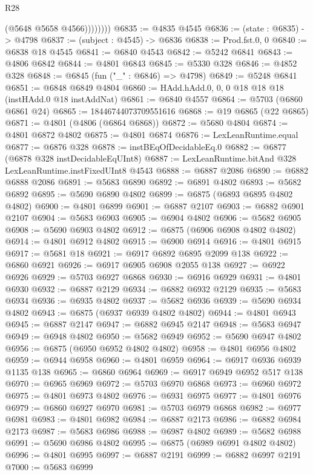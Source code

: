 \begin{lexlean}{R28}
\begin{coremodule}
                  (@5648 @5658 @4566))))))))
@6835 := @4835 @4545
@6836 := (state : @6835) -> @4798
@6837 := (subject : @4545) -> @6836
@6838 := Prod.fst.{0, 0}
@6840 := @6838 @18 @4545
@6841 := @6840 @4543
@6842 := @5242 @6841
@6843 := @4806 @6842
@6844 := @4801 @6843
@6845 := @5330 @328
@6846 := @4852 @328
@6848 := @6845 (fun ("_" : @6846) => @4798)
@6849 := @5248 @6841
@6851 := @6848 @6849 @4804
@6860 := HAdd.hAdd.{0, 0, 0} @18 @18 @18 (instHAdd.{0} @18 instAddNat)
@6861 := @6840 @4557
@6864 := @5703 (@6860 @6861 @24)
@6865 := 18446744073709551616
@6868 := @19 @6865 (@22 @6865)
@6871 := @4801 (@4806 (@6864 @6868))
@6872 := @5680 @4804
@6874 := @4801 @6872 @4802
@6875 := @4801 @6874
@6876 := LexLeanRuntime.equal
@6877 := @6876 @328
@6878 := instBEqOfDecidableEq.{0}
@6882 := @6877 (@6878 @328 instDecidableEqUInt8)
@6887 := LexLeanRuntime.bitAnd @328 LexLeanRuntime.instFixedUInt8 @4543
@6888 := @6887 @2086
@6890 := @6882 @6888 @2086
@6891 := @5683 @6890
@6892 := @6891 @4802
@6893 := @5682 @6892
@6895 := @5690 @6890 @4802
@6899 := @6875 (@6893 @6895 @4802 @4802)
@6900 := @4801 @6899
@6901 := @6887 @2107
@6903 := @6882 @6901 @2107
@6904 := @5683 @6903
@6905 := @6904 @4802
@6906 := @5682 @6905
@6908 := @5690 @6903 @4802
@6912 := @6875 (@6906 @6908 @4802 @4802)
@6914 := @4801 @6912 @4802
@6915 := @6900 @6914
@6916 := @4801 @6915
@6917 := @5681 @18
@6921 := @6917 @6892 @6895 @2099 @138
@6922 := @6860 @6921
@6926 := @6917 @6905 @6908 @2055 @138
@6927 := @6922 @6926
@6929 := @5703 @6927 @6868
@6930 := @6916 @6929
@6931 := @4801 @6930
@6932 := @6887 @2129
@6934 := @6882 @6932 @2129
@6935 := @5683 @6934
@6936 := @6935 @4802
@6937 := @5682 @6936
@6939 := @5690 @6934 @4802
@6943 := @6875 (@6937 @6939 @4802 @4802)
@6944 := @4801 @6943
@6945 := @6887 @2147
@6947 := @6882 @6945 @2147
@6948 := @5683 @6947
@6949 := @6948 @4802
@6950 := @5682 @6949
@6952 := @5690 @6947 @4802
@6956 := @6875 (@6950 @6952 @4802 @4802)
@6958 := @4801 @6956 @4802
@6959 := @6944 @6958
@6960 := @4801 @6959
@6964 := @6917 @6936 @6939 @1135 @138
@6965 := @6860 @6964
@6969 := @6917 @6949 @6952 @517 @138
@6970 := @6965 @6969
@6972 := @5703 @6970 @6868
@6973 := @6960 @6972
@6975 := @4801 @6973 @4802
@6976 := @6931 @6975
@6977 := @4801 @6976
@6979 := @6860 @6927 @6970
@6981 := @5703 @6979 @6868
@6982 := @6977 @6981
@6983 := @4801 @6982
@6984 := @6887 @2173
@6986 := @6882 @6984 @2173
@6987 := @5683 @6986
@6988 := @6987 @4802
@6989 := @5682 @6988
@6991 := @5690 @6986 @4802
@6995 := @6875 (@6989 @6991 @4802 @4802)
@6996 := @4801 @6995
@6997 := @6887 @2191
@6999 := @6882 @6997 @2191
@7000 := @5683 @6999

\end{coremodule}
\end{lexlean}
